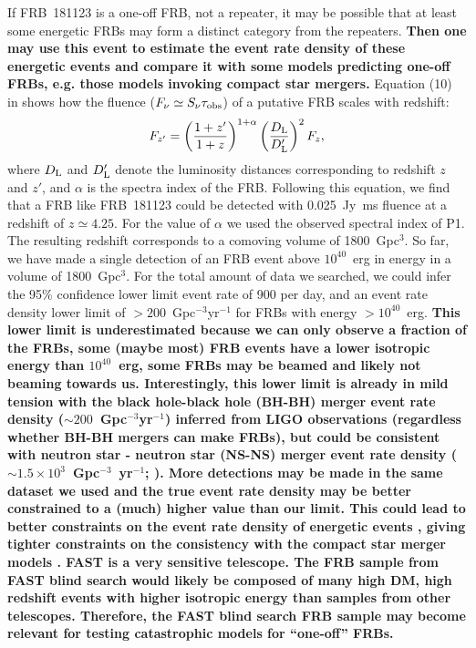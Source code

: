 If FRB~181123 is a one-off FRB, not a repeater, it may be possible that at least some energetic FRBs may form a distinct category from the repeaters. 
{\bf Then one may use this event to estimate the event rate density of these energetic events and compare it with some models predicting one-off FRBs, e.g. those models invoking compact star mergers. }
Equation (10) in \citet{zhang18} shows how the fluence ($F_{\nu}\simeq  S_{\nu}\tau_{\rm obs}$) of a putative FRB scales with redshift: \begin{equation}
    F_{z'} = \left(\frac{1+z'}{1+z}\right)^{1+\alpha}\left(\frac{D_{\rm L}}{D_{\rm L}'}\right)^2F_{z},
\end{equation} 
where $D_{\rm L}$ and $D_{\rm L}'$ denote the luminosity distances corresponding to redshift $z$ and $z'$, and $\alpha$ is the spectra index of the FRB.
Following this equation, we find that a FRB like FRB~181123 could be detected with
0.025~Jy~ms fluence at a redshift of $z\simeq4.25$. 
For the value of $\alpha$ we used the observed spectral index of P1.
The resulting redshift corresponds to a comoving volume of 1800~Gpc$^3$. 
So far, we have made a single detection of an FRB event above $10^{40}$~erg in energy in a volume of 1800~Gpc$^3$. 
For the total amount of data we searched, we could infer the 95\% confidence lower limit event rate of 900 per day, and an event rate density lower limit of $>200$~Gpc$^{-3}$yr$^{-1}$ for FRBs with energy $>10^{40}$~erg. 
{\bf This lower limit is underestimated because we can only observe a fraction of the FRBs, some (maybe most) FRB events have a lower isotropic energy than $10^{40}$~erg, some FRBs may be beamed and likely not beaming towards us. 
Interestingly, this lower limit is already in mild tension with the black hole-black hole (BH-BH) merger event rate density ($\sim 200$~Gpc$^{-3}$yr$^{-1}$) inferred from LIGO observations \citep{mg18} (regardless whether BH-BH mergers can make FRBs), but could be consistent with neutron star - neutron star (NS-NS) merger event rate density ($\sim 1.5\times10^3$~Gpc$^{-3}$~yr$^{-1}$; \citealt{aaa+17}). More detections may be made in the same dataset we used and the true event rate density may be better constrained to a (much) higher value than our limit. This could lead to better constraints on the event rate density of energetic events \citep{lml+20}, giving tighter constraints on the consistency with the compact star merger models \citep[see also][]{wang20}. 
FAST is a very sensitive telescope. The FRB sample from FAST blind search
would likely be composed of many high DM, high redshift events with higher
isotropic energy than samples from other telescopes. Therefore, the FAST blind
search FRB sample may become relevant for testing catastrophic models for ``one-off'' FRBs.
}

